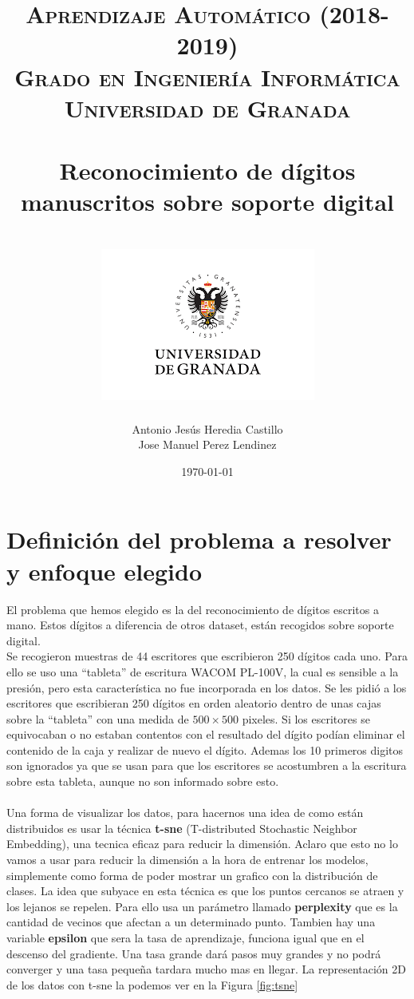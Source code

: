 \documentclass[12pt,a4paper]{article}
\title{
\normalfont \normalsize 
\textsc{{\bf Aprendizaje Automático (2018-2019)} \\ Grado en Ingeniería Informática \\ Universidad de Granada} \\ [25pt] %
\horrule{0.5pt} \\[0.4cm] %
\huge 
Reconocimiento de dígitos manuscritos sobre soporte digital \\ %
\horrule{2pt} \\[0.5cm] %
\includegraphics{images/logo.png}	
}
\author{Antonio Jesús Heredia Castillo \\ Jose Manuel Perez Lendinez} %
\date{\normalsize\today} %
\begin{document}
\maketitle %
\newpage %
\tableofcontents %
\listoffigures
\listoftables
\newpage

\section{Definición del problema a resolver y enfoque elegido}
El problema que hemos elegido es la del reconocimiento de dígitos escritos a mano. Estos dígitos a diferencia de otros dataset, están recogidos sobre soporte digital. \\ Se recogieron muestras de 44 escritores que escribieron 250 dígitos cada uno. Para ello se uso una ``tableta'' de escritura WACOM PL-100V, la cual es sensible a la presión, pero esta característica no fue incorporada en los datos. Se les pidió a los escritores que escribieran 250 dígitos en orden aleatorio dentro de unas cajas sobre la ``tableta'' con una medida de $500\times500$ pixeles. Si los escritores se equivocaban o no estaban contentos con el resultado del dígito podían eliminar el contenido de la caja y realizar de nuevo el dígito. Ademas los 10 primeros digitos son ignorados ya que se usan para que los escritores se acostumbren a la escritura sobre esta tableta, aunque no son informado sobre esto.\\\\
Una forma de visualizar los datos, para hacernos una idea de como están distribuidos es usar la técnica \textbf{t-sne} (T-distributed Stochastic Neighbor Embedding), una tecnica eficaz para reducir la dimensión. Aclaro que esto no lo vamos a usar para reducir la dimensión a la hora de entrenar los modelos, simplemente como forma de poder mostrar un grafico con la distribución de clases. La idea que subyace en esta técnica es que los puntos cercanos se atraen y los lejanos se repelen. Para ello usa un parámetro llamado \textbf{perplexity} que es la cantidad de vecinos que afectan a un determinado punto. Tambien hay una variable \textbf{epsilon} que sera la tasa de aprendizaje, funciona igual que en el descenso del gradiente. Una tasa grande dará pasos muy grandes y no podrá converger y una tasa pequeña tardara mucho mas en llegar. La representación 2D de los datos con t-sne la podemos ver en la Figura \ref{fig:tsne}
\end{document}
